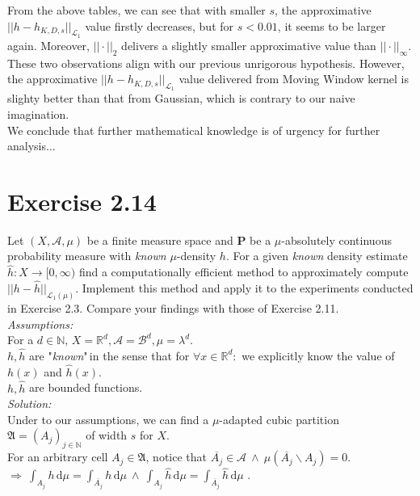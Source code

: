 \documentclass{article}
\begin{document}
\noindent From the above tables, we can see that with smaller $s$, the approximative $||h-h_{K,D,s}||_{\mathcal{L}_1}$ value firstly decreases, but for $s<0.01$, it seems to be larger again. Moreover, $||\cdot||_2$ delivers a slightly smaller approximative value than $||\cdot||_{\infty}$. These two observations align with our previous unrigorous hypothesis. However, the approximative $||h-h_{K,D,s}||_{\mathcal{L}_1}$ value delivered from Moving Window kernel is slighty better than that from Gaussian, which is contrary to our naive imagination.\\
We conclude that further  mathematical knowledge is of urgency for further analysis... 

\section*{Exercise 2.14} \vspace*{-1em}
Let $(X,\mathcal{A},\mu)$ be a finite measure space and $\mathbf{P}$ be a $\mu$-absolutely continuous probability measure with \textit{known} $\mu$-density $h$. For a given \textit{known} density estimate $\hat{h}:X \rightarrow [0,\infty)$ find a computationally efficient method to approximately compute $||h-\hat{h}||_{\mathcal{L}_1(\mu)}$. Implement this method and apply it to the experiments conducted in Exercise 2.3. Compare your findings with those of Exercise 2.11. \vspace*{0.5em}\\
\textit{Assumptions:}\\
For a $d\in \mathbb{N}$, $X=\mathbb{R}^d, \mathcal{A} = \mathcal{B}^d, \mu = \lambda ^d $.\\
$h, \hat{h}$ are "\textit{known}"\,in the sense that for $\forall x\in \mathbb{R}^d:$ we explicitly know the value of $h(x)$ and $\hat{h}(x)$.  \vspace*{0.5em}\\
$h, \hat{h}$ are bounded functions. \\
\textit{Solution:}\\
Under to our assumptions, we can find a $\mu$-adapted cubic partition $\mathfrak{A} = (A_j)_{j\in \mathbb{N}}$ of width $s$ for $X$.  \\
For an arbitrary cell $A_j\in \mathfrak{A}$,  notice that $\overline{A_j} \in \mathcal{A} \ \land \  \mu(\overline{A_j}\backslash A_j) = 0 $. \vspace*{0.5em}  \\
$\Rightarrow \ \displaystyle{ \int_{A_j}   h\, \text{d} \mu =  \int_{\overline{A_j}} h \,  \text{d} \mu } \ \land \  \displaystyle{ \int_{A_j}   \hat{h}\, \text{d} \mu =  \int_{\overline{A_j}} \hat{h} \,  \text{d} \mu }  $ . \vspace*{0.5em}   \\
\end{document}
